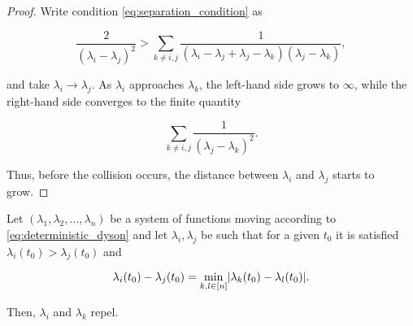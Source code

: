 \begin{proof}
    Write condition \eqref{eq:separation_condition} as

    \begin{equation*}
        \frac{2}{(\lambda_i - \lambda_j)^2} > \sum_{k\neq i,j} \frac{1}{(\lambda_i - \lambda_j + \lambda_j -\lambda_k)(\lambda_j - \lambda_k)},
    \end{equation*}

    \noindent and take $\lambda_i \to \lambda_j$. As $\lambda_i$ approaches $\lambda_k$, the left-hand side grows to $\infty$, while the right-hand side converges to the finite quantity

    \begin{equation*}
        \sum_{k\neq i,j} \frac{1}{(\lambda_j - \lambda_k)^2}.
    \end{equation*}

    Thus, before the collision occurs, the distance between $\lambda_i$ and $\lambda_j$ starts to grow.
\end{proof}

\begin{theorem} \label{thm:hermite_minimal_grows}
    Let $(\lambda_1, \lambda_2, \dots, \lambda_n)$ be a system of functions moving according to \eqref{eq:deterministic_dyson} and let $\lambda_i,\lambda_j$ be such that for a given $t_0$ it is satisfied $\lambda_i(t_0) > \lambda_j(t_0)$ and 
    
    \begin{equation*}
        \lambda_i(t_0) - \lambda_j(t_0) = \min_{k,l \in [n]} \lvert  \lambda_k(t_0) - \lambda_l(t_0) \rvert.
    \end{equation*}

    Then, $\lambda_i$ and $\lambda_k$ repel. 
\end{theorem}

